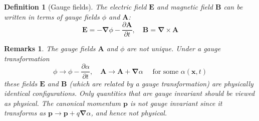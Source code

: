 \documentclass[a4paper]{article}
\newtheorem{remarks}{Remarks}[section]
\theoremstyle{new}
\newtheorem{defi}{Definition}[section]
\begin{document}
\begin{defi}[Gauge fields]
The electric field $\mathbf{E}$ and magnetic field $\mathbf{B}$ can be written in terms of gauge fields $\phi$ and $\mathbf{A}$:
$$\mathbf{E}=-\boldsymbol{\nabla}\phi-\frac{\partial\mathbf{A}}{\partial t},\quad\mathbf{B}=\boldsymbol{\nabla}\times\mathbf{A}$$
\end{defi}
\begin{remarks}
The gauge fields $\mathbf{A}$ and $\phi$ are not unique. Under a gauge transformation
$$\phi\rightarrow\phi-\frac{\partial\alpha}{\partial t},\quad\mathbf{A}\rightarrow\mathbf{A}+\boldsymbol{\nabla}\alpha\quad\text{ for some }\alpha(\mathbf{x},t)$$
these fields $\mathbf{E}$ and $\mathbf{B}$ (which are related by a gauge transformation) are physically identical configurations. Only quantities that are gauge invariant should be viewed as physical. The canonical momentum $\mathbf{p}$ is not gauge invariant since it transforms as $\mathbf{p}\rightarrow\mathbf{p}+q\boldsymbol{\nabla}\alpha$, and hence not physical.
\end{remarks}
\end{document}
